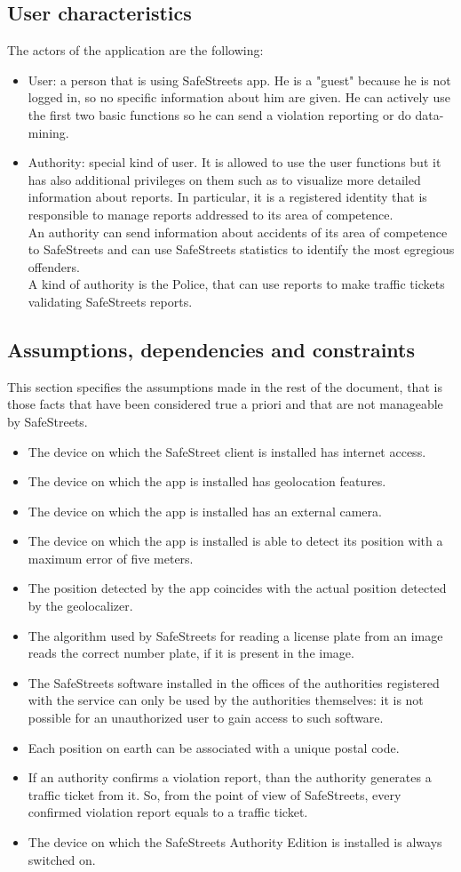 \documentclass{article}
\newcommand\assumption[1]{\item[{[A#1]}] }
\begin{document}
		\subsection{User characteristics}
			The actors of the application are the following:
			\begin{itemize}
				\item User: a person that is using SafeStreets app. He is a "guest" because he is not logged in, so no specific information about him are given. He can actively use the first two basic functions so he can send a violation reporting or do data-mining.
				\item Authority: special kind of user. It is allowed to use the user functions but it has also additional privileges on them such as to visualize more detailed information about reports. In particular, it is a registered identity that is responsible to manage reports addressed to its area of competence.\\
				An authority can send information about accidents of its area of competence to SafeStreets and can use SafeStreets statistics to identify the most egregious offenders.\\
		        A kind of authority is the Police, that can use reports to make traffic tickets validating SafeStreets reports.
			\end{itemize}
		
		\subsection{Assumptions, dependencies and constraints}	\label{assumptions}
			This section specifies the assumptions made in the rest of the document, that is those facts that have been considered true a priori and that are not manageable by SafeStreets.
			\begin{itemize}
				\assumption{1} The device on which the SafeStreet client is installed has internet access.
				\assumption{2} The device on which the app is installed has geolocation features.
				\assumption{3} The device on which the app is installed has an external camera.
				\assumption{4} The device on which the app is installed is able to detect its position with a maximum error of five meters.
				\assumption{5} The position detected by the app coincides with the actual position detected by the geolocalizer.
				\assumption{6} The algorithm used by SafeStreets for reading a license plate from an image reads the correct number plate, if it is present in the image.
				\assumption{7} The SafeStreets software installed in the offices of the authorities registered with the service can only be used by the authorities themselves: it is not possible for an unauthorized user to gain access to such software.
				\assumption{8} Each position on earth can be associated with a unique postal code.
				\assumption{9} If an authority confirms a violation report, than the authority generates a traffic ticket from it. So, from the point of view of SafeStreets, every confirmed violation report equals to a traffic ticket.
				\assumption{10} The device on which the SafeStreets Authority Edition is installed is always switched on.
			\end{itemize}
	
\end{document}
